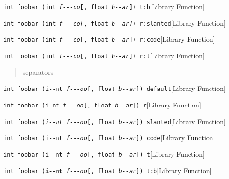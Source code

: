 \documentclass{book}
\begin{document}
%
\noindent\texttt{int foobar (int \textsl{f{-}{-}{-}oo}\texttt{\textbf{[}}, float \textsl{b{-}{-}ar}\texttt{\textbf{{]}}}) t:b}\hfill[Library Function]



%
\noindent\texttt{int foobar (int \textsl{f{-}{-}{-}oo}\textnormal{\textsl{[}}, float \textsl{b{-}{-}ar}\textnormal{\textsl{{]}}}) r:slanted}\hfill[Library Function]



%
\noindent\texttt{int foobar (int \textsl{f{-}{-}{-}oo}\textnormal{\texttt{[}}, float \textsl{b{-}{-}ar}\textnormal{\texttt{{]}}}) r:code}\hfill[Library Function]



%
\noindent\texttt{int foobar (int \textsl{f{-}{-}{-}oo}\textnormal{\texttt{[}}, float \textsl{b{-}{-}ar}\textnormal{\texttt{{]}}}) r:t}\hfill[Library Function]



%
\begin{quote}
separators
\end{quote}

\noindent\texttt{int foobar (i{-}{-}nt \textsl{f{-}{-}{-}oo}[, float \textsl{b{-}{-}ar}{]}) default}\hfill[Library Function]



%
\noindent\texttt{int foobar (\textnormal{i--nt} \textsl{f{-}{-}{-}oo}[, float \textsl{b{-}{-}ar}{]}) r}\hfill[Library Function]



%
\noindent\texttt{int foobar (\textsl{i{-}{-}nt} \textsl{f{-}{-}{-}oo}[, float \textsl{b{-}{-}ar}{]}) slanted}\hfill[Library Function]



%
\noindent\texttt{int foobar (\texttt{i{-}{-}nt} \textsl{f{-}{-}{-}oo}[, float \textsl{b{-}{-}ar}{]}) code}\hfill[Library Function]



%
\noindent\texttt{int foobar (\texttt{i{-}{-}nt} \textsl{f{-}{-}{-}oo}[, float \textsl{b{-}{-}ar}{]}) t}\hfill[Library Function]



%
\noindent\texttt{int foobar (\texttt{\textbf{i{-}{-}nt}} \textsl{f{-}{-}{-}oo}[, float \textsl{b{-}{-}ar}{]}) t:b}\hfill[Library Function]
\end{document}
